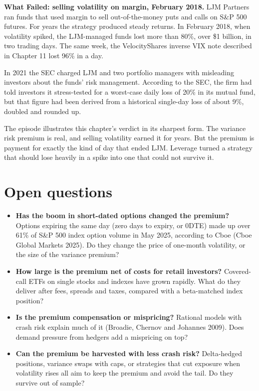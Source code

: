 \begin{callout}
\textbf{What Failed: selling volatility on margin, February 2018.} LJM Partners ran funds that used margin to sell out-of-the-money puts and calls on S\&P 500 futures. For years the strategy produced steady returns. In February 2018, when volatility spiked, the LJM-managed funds lost more than 80\%, over \$1 billion, in two trading days. The same week, the VelocityShares inverse VIX note described in Chapter 11 lost 96\% in a day.

In 2021 the SEC charged LJM and two portfolio managers with misleading investors about the funds' risk management. According to the SEC, the firm had told investors it stress-tested for a worst-case daily loss of 20\% in its mutual fund, but that figure had been derived from a historical single-day loss of about 9\%, doubled and rounded up.

The episode illustrates this chapter's verdict in its sharpest form. The variance risk premium is real, and selling volatility earned it for years. But the premium is payment for exactly the kind of day that ended LJM. Leverage turned a strategy that should lose heavily in a spike into one that could not survive it.
\end{callout}

\section{Open questions}
\label{sec:14-open}

\begin{itemize}
  \item \textbf{Has the boom in short-dated options changed the premium?} Options expiring the same day (zero days to expiry, or 0DTE) made up over 61\% of S\&P 500 index option volume in May 2025, according to Cboe (Cboe Global Markets 2025). Do they change the price of one-month volatility, or the size of the variance premium?
  \item \textbf{How large is the premium net of costs for retail investors?} Covered-call ETFs on single stocks and indexes have grown rapidly. What do they deliver after fees, spreads and taxes, compared with a beta-matched index position?
  \item \textbf{Is the premium compensation or mispricing?} Rational models with crash risk explain much of it (Broadie, Chernov and Johannes 2009). Does demand pressure from hedgers add a mispricing on top?
  \item \textbf{Can the premium be harvested with less crash risk?} Delta-hedged positions, variance swaps with caps, or strategies that cut exposure when volatility rises all aim to keep the premium and avoid the tail. Do they survive out of sample?
\end{itemize}


